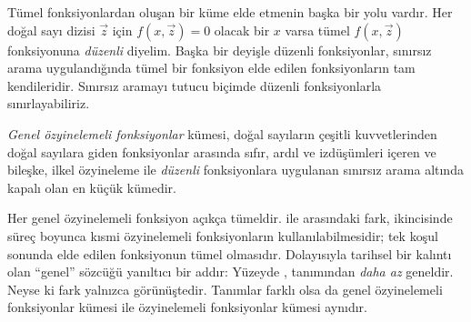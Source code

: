 


Tümel fonksiyonlardan oluşan bir küme elde etmenin başka bir yolu vardır.
Her doğal sayı dizisi $\vec z$ için $f(x,\vec z)=0$ olacak bir $x$ varsa
tümel $f(x,\vec z)$ fonksiyonuna \emph{düzenli} diyelim. Başka bir deyişle
düzenli fonksiyonlar, sınırsız arama uygulandığında tümel bir fonksiyon elde
edilen fonksiyonların tam kendileridir. Sınırsız aramayı tutucu biçimde
düzenli fonksiyonlarla sınırlayabiliriz.

\begin{defn}
\emph{Genel özyinelemeli fonksiyonlar} kümesi, doğal sayıların çeşitli
kuvvetlerinden doğal sayılara giden fonksiyonlar arasında sıfır, ardıl ve
izdüşümleri içeren ve bileşke, ilkel özyineleme ile \emph{düzenli}
fonksiyonlara uygulanan sınırsız arama altında kapalı olan en küçük kümedir.
\end{defn}

Her genel özyinelemeli fonksiyon açıkça tümeldir.
 ile  arasındaki
fark, ikincisinde süreç boyunca kısmi özyinelemeli fonksiyonların
kullanılabilmesidir; tek koşul sonunda elde edilen fonksiyonun tümel
olmasıdır. Dolayısıyla tarihsel bir kalıntı olan ``genel'' sözcüğü yanıltıcı
bir addır: Yüzeyde ,
 tanımından \emph{daha az} geneldir. Neyse ki
fark yalnızca görünüştedir. Tanımlar farklı olsa da genel özyinelemeli
fonksiyonlar kümesi ile özyinelemeli fonksiyonlar kümesi aynıdır.

